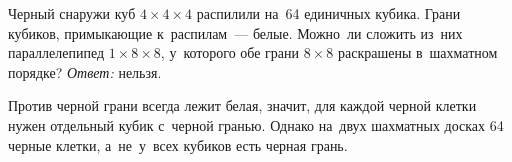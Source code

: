 \problem
Черный снаружи куб $4 \times 4 \times 4$ распилили на~64 единичных кубика.
Грани кубиков, примыкающие к~распилам~--- белые.
Можно~ли сложить из~них параллелепипед $1 \times 8 \times 8$, у~которого обе
грани $8 \times 8$ раскрашены в~шахматном порядке?
\solution
\emph{Ответ:} нельзя.
\par
Против черной грани всегда лежит белая, значит, для каждой черной клетки нужен
отдельный кубик с~черной гранью.
Однако на~двух шахматных досках 64 черные клетки, а~не~у~всех кубиков есть
черная грань. 
\endproblem
